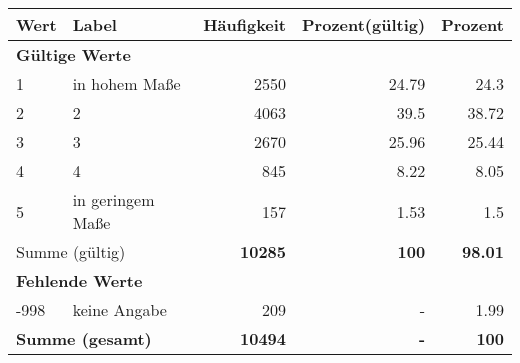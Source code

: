      \begin{longtable}{lXrrr}
     \toprule
     \textbf{Wert} & \textbf{Label} & \textbf{Häufigkeit} & \textbf{Prozent(gültig)} & \textbf{Prozent} \\
     \endhead
     \midrule
     \multicolumn{5}{l}{\textbf{Gültige Werte}}\\

     1 &
     \multicolumn{1}{X}{ in hohem Maße   } &


       \num{2550} &
       \num[round-mode=places,round-precision=2]{24,79} &
         \num[round-mode=places,round-precision=2]{24,3} \\

     2 &
     \multicolumn{1}{X}{ 2   } &


       \num{4063} &
       \num[round-mode=places,round-precision=2]{39,5} &
         \num[round-mode=places,round-precision=2]{38,72} \\

     3 &
     \multicolumn{1}{X}{ 3   } &


       \num{2670} &
       \num[round-mode=places,round-precision=2]{25,96} &
         \num[round-mode=places,round-precision=2]{25,44} \\

     4 &
     \multicolumn{1}{X}{ 4   } &


       \num{845} &
       \num[round-mode=places,round-precision=2]{8,22} &
         \num[round-mode=places,round-precision=2]{8,05} \\

     5 &
     \multicolumn{1}{X}{ in geringem Maße   } &


       \num{157} &
       \num[round-mode=places,round-precision=2]{1,53} &
         \num[round-mode=places,round-precision=2]{1,5} \\
     \midrule
     \multicolumn{2}{l}{Summe (gültig)} &
       \textbf{\num{10285}} &
     \textbf{100} &
       \textbf{\num[round-mode=places,round-precision=2]{98,01}} \\
     \multicolumn{5}{l}{\textbf{Fehlende Werte}}\\
       -998 &
       keine Angabe &
         \num{209} &
        - &
         \num[round-mode=places,round-precision=2]{1,99} \\
     \midrule
     \multicolumn{2}{l}{\textbf{Summe (gesamt)}} &
          \textbf{\num{10494}} &
        \textbf{-} &
        \textbf{100} \\
     \bottomrule
     \end{longtable}
     
